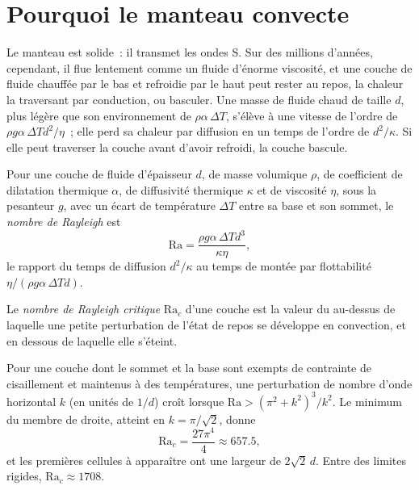 \section{Pourquoi le manteau convecte}

Le manteau est solide~: il transmet les ondes S. Sur des millions d'années, cependant, il
flue lentement comme un fluide d'énorme viscosité, et une couche de fluide chauffée par
le bas et refroidie par le haut peut rester au repos, la chaleur la traversant par
conduction, ou basculer. Une masse de fluide chaud de taille $d$, plus légère que son
environnement de $\rho\alpha\,\Delta T$, s'élève à une vitesse de
l'ordre de $\rho g\alpha\,\Delta T d^2/\eta$~; elle perd sa chaleur par diffusion en un temps de
l'ordre de $d^2/\kappa$. Si elle peut traverser la couche avant d'avoir refroidi,
la couche bascule.

\begin{definition}\label{def:b3:mantle-convection:rayleigh}
Pour une couche de fluide d'épaisseur $d$, de masse volumique $\rho$, de coefficient de
dilatation thermique $\alpha$, de diffusivité thermique $\kappa$ et de viscosité $\eta$, sous
la pesanteur $g$, avec un écart de température $\Delta T$ entre sa base et son
sommet, le \emph{nombre de Rayleigh} est
\[
  \mathrm{Ra} = \frac{\rho g\alpha\,\Delta T d^3}{\kappa\eta},
\]
le rapport du temps de diffusion $d^2/\kappa$ au temps de montée
par flottabilité $\eta/(\rho g\alpha\,\Delta Td)$.
\end{definition}

\begin{definition}\label{def:b3:mantle-convection:critical}
Le \emph{nombre de Rayleigh critique}
$\mathrm{Ra}_c$ d'une couche est la valeur du  au-dessus de laquelle une
petite perturbation de l'état de repos se développe en convection, et en dessous de laquelle
elle s'éteint.
\end{definition}

\begin{proposition}\label{prop:b3:mantle-convection:onset}
Pour une couche dont le sommet et la base sont exempts de contrainte de cisaillement et maintenus à des
températures, une perturbation de nombre d'onde horizontal $k$ (en unités de $1/d$)
croît lorsque $\mathrm{Ra} > (\pi^2 + k^2)^3/k^2$. Le minimum du membre
de droite, atteint en $k = \pi/\sqrt2$, donne
\[
  \mathrm{Ra}_c = \frac{27\pi^4}{4} \approx 657.5,
\]
et les premières cellules à apparaître ont une largeur de $2\sqrt2\,d$. Entre des limites rigides,
$\mathrm{Ra}_c \approx 1708$.
\end{proposition}


